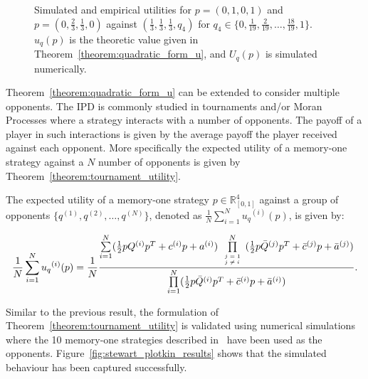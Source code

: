 \begin{figure}[!htbp]
\begin{center}
\begin{subfigure}{0.45\textwidth}
        \end{subfigure}
    \end{center}
    \caption{Simulated and empirical utilities for \(p = (0, 1, 0, 1)\)
    and \(p = (0, \frac{2}{3}, \frac{1}{3}, 0)\) against \((\frac{1}{3}, \frac{1}{3}, \frac{1}{3}, q_4)\) for
    \(q_4 \in \{0,  \frac{1}{19}, \frac{2}{19}, \dots, \frac{18}{19}, 1\}\).
    \(u_q(p)\) is the theoretic value given in Theorem~\ref{theorem:quadratic_form_u},
    and \(U_q(p)\) is simulated numerically.}
    \label{fig:analytical_simulated}
\end{figure}

Theorem~\ref{theorem:quadratic_form_u} can be extended to consider multiple
opponents. The IPD is commonly studied in tournaments and/or Moran Processes
where a strategy interacts with a number of opponents. The payoff of a player in
such interactions is given by the average payoff the player received against
each opponent. More specifically the expected utility of a memory-one strategy
against a \(N\) number of opponents is given by
Theorem~\ref{theorem:tournament_utility}.

\begin{theorem}\label{theorem:tournament_utility}
    The expected utility of a memory-one strategy \(p\in\mathbb{R}_{[0,1]}^4\)
    against a group of opponents \(\{q^{(1)}, q^{(2)}, \dots, q^{(N)}\}\), denoted
    as \(\frac{1}{N} \sum\limits_{i=1} ^ {N} {u_q}^{(i)} (p)\), is given by:

    \begin{equation}\label{eq:tournament_utility}
        \frac{1}{N} \sum\limits_{i=1} ^ {N} {u_q}^{(i)} (p) = \frac{1}{N}
        \frac{\sum\limits_{i=1} ^ {N} (\frac{1}{2} pQ^{(i)} p^T + c^{(i)} p + a^ {(i)})
        \prod\limits_{\tiny\begin{array}{l} j=1 \\ j \neq i \end{array}} ^
        N (\frac{1}{2} p\bar{Q}^{(j)} p^T + \bar{c}^{(j)} p + \bar{a}^ {(j)})}
        {\prod\limits_{i=1} ^ N (\frac{1}{2} p\bar{Q}^{(i)} p^T + \bar{c}^{(i)} p + \bar{a}^ {(i)})}.
    \end{equation}
\end{theorem}

Similar to the previous result, the formulation of
Theorem~\ref{theorem:tournament_utility} is validated using numerical
simulations where the 10 memory-one strategies described in~\cite{Stewart2012}
have been used as the opponents. Figure~\ref{fig:stewart_plotkin_results} shows
that the simulated behaviour has been captured successfully.


